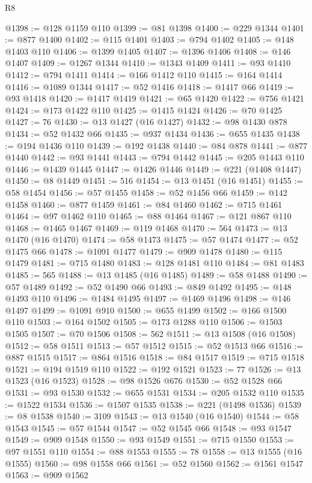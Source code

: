 \begin{lexlean}{R8}
\begin{coremodule}
@1398 := @128 @1159 @110
@1399 := @81 @1398
@1400 := @229 @1344
@1401 := @877 @1400
@1402 := @115 @1401
@1403 := @794 @1402
@1405 := @148 @1403 @110
@1406 := @1399 @1405
@1407 := @1396 @1406
@1408 := @146 @1407
@1409 := @1267 @1344
@1410 := @1343 @1409
@1411 := @93 @1410
@1412 := @794 @1411
@1414 := @166 @1412 @110
@1415 := @164 @1414
@1416 := @1089 @1344
@1417 := @52 @1416
@1418 := @1417 @66
@1419 := @93 @1418
@1420 := @1417 @1419
@1421 := @65 @1420
@1422 := @756 @1421
@1424 := @173 @1422 @110
@1425 := @1415 @1424
@1426 := @70 @1425
@1427 := 76
@1430 := @13 @1427 (@16 @1427)
@1432 := @98 @1430 @878
@1434 := @52 @1432 @66
@1435 := @937 @1434
@1436 := @655 @1435
@1438 := @194 @1436 @110
@1439 := @192 @1438
@1440 := @84 @878
@1441 := @877 @1440
@1442 := @93 @1441
@1443 := @794 @1442
@1445 := @205 @1443 @110
@1446 := @1439 @1445
@1447 := @1426 @1446
@1449 := @221 (@1408 @1447)
@1450 := @8 @1449
@1451 := 516
@1454 := @13 @1451 (@16 @1451)
@1455 := @58 @1454
@1456 := @57 @1455
@1458 := @52 @1456 @66
@1459 := @142 @1458
@1460 := @877 @1459
@1461 := @84 @1460
@1462 := @715 @1461
@1464 := @97 @1462 @110
@1465 := @88 @1464
@1467 := @121 @867 @110
@1468 := @1465 @1467
@1469 := @119 @1468
@1470 := 564
@1473 := @13 @1470 (@16 @1470)
@1474 := @58 @1473
@1475 := @57 @1474
@1477 := @52 @1475 @66
@1478 := @1091 @1477
@1479 := @909 @1478
@1480 := @115 @1479
@1481 := @715 @1480
@1483 := @128 @1481 @110
@1484 := @81 @1483
@1485 := 565
@1488 := @13 @1485 (@16 @1485)
@1489 := @58 @1488
@1490 := @57 @1489
@1492 := @52 @1490 @66
@1493 := @849 @1492
@1495 := @148 @1493 @110
@1496 := @1484 @1495
@1497 := @1469 @1496
@1498 := @146 @1497
@1499 := @1091 @910
@1500 := @655 @1499
@1502 := @166 @1500 @110
@1503 := @164 @1502
@1505 := @173 @1288 @110
@1506 := @1503 @1505
@1507 := @70 @1506
@1508 := 562
@1511 := @13 @1508 (@16 @1508)
@1512 := @58 @1511
@1513 := @57 @1512
@1515 := @52 @1513 @66
@1516 := @887 @1515
@1517 := @864 @1516
@1518 := @84 @1517
@1519 := @715 @1518
@1521 := @194 @1519 @110
@1522 := @192 @1521
@1523 := 77
@1526 := @13 @1523 (@16 @1523)
@1528 := @98 @1526 @676
@1530 := @52 @1528 @66
@1531 := @93 @1530
@1532 := @655 @1531
@1534 := @205 @1532 @110
@1535 := @1522 @1534
@1536 := @1507 @1535
@1538 := @221 (@1498 @1536)
@1539 := @8 @1538
@1540 := 3109
@1543 := @13 @1540 (@16 @1540)
@1544 := @58 @1543
@1545 := @57 @1544
@1547 := @52 @1545 @66
@1548 := @93 @1547
@1549 := @909 @1548
@1550 := @93 @1549
@1551 := @715 @1550
@1553 := @97 @1551 @110
@1554 := @88 @1553
@1555 := 78
@1558 := @13 @1555 (@16 @1555)
@1560 := @98 @1558 @66
@1561 := @52 @1560
@1562 := @1561 @1547
@1563 := @909 @1562

\end{coremodule}
\end{lexlean}
